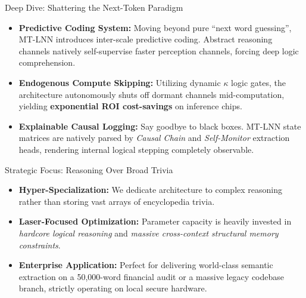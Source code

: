 ﻿\documentclass[aspectratio=169, 10pt]{beamer}
\begin{document}
\begin{frame}{Deep Dive: Shattering the Next-Token Paradigm}
\begin{itemize}
    \item \textbf{Predictive Coding System:} Moving beyond pure ``next word guessing'', MT-LNN introduces inter-scale predictive coding. Abstract reasoning channels natively self-supervise faster perception channels, forcing deep logic comprehension.
    \item \textbf{Endogenous Compute Skipping:} Utilizing dynamic $\kappa$ logic gates, the architecture autonomously shuts off dormant channels mid-computation, yielding \textbf{exponential ROI cost-savings} on inference chips.
    \item \textbf{Explainable Causal Logging:} Say goodbye to black boxes. MT-LNN state matrices are natively parsed by \textit{Causal Chain} and \textit{Self-Monitor} extraction heads, rendering internal logical stepping completely observable.
\end{itemize}
\end{frame}

\begin{frame}{Strategic Focus: Reasoning Over Broad Trivia}
\begin{itemize}
    \item \textbf{Hyper-Specialization:} We dedicate architecture to complex reasoning rather than storing vast arrays of encyclopedia trivia.
    \item \textbf{Laser-Focused Optimization:} Parameter capacity is heavily invested in \textit{hardcore logical reasoning} and \textit{massive cross-context structural memory constraints}.
    \item \textbf{Enterprise Application:} Perfect for delivering world-class semantic extraction on a 50,000-word financial audit or a massive legacy codebase branch, strictly operating on local secure hardware.
\end{itemize}
\end{frame}
\end{document}
